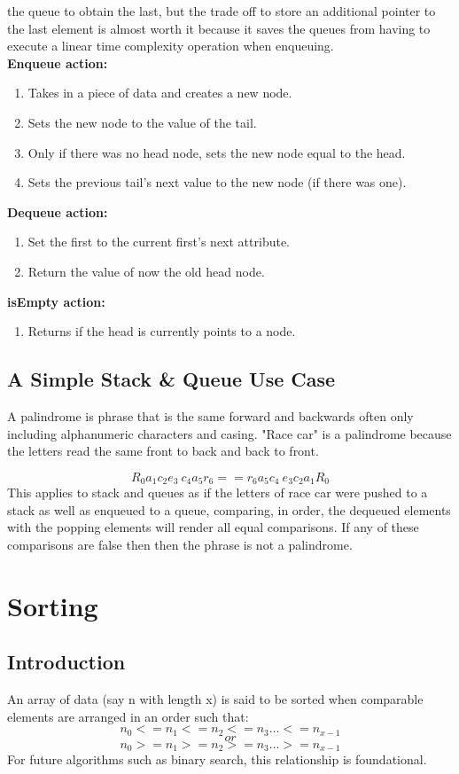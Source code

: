 \documentclass[letterpaper, 10pt]{article}
\begin{document}
the queue to obtain the last, but the trade off to store an additional pointer to the last element is almost worth it because
it saves the queues from having to execute a linear time complexity operation when enqueuing.\\
\textbf{Enqueue action:}
\begin{enumerate}
    \item Takes in a piece of data and creates a new node.
    \item Sets the new node to the value of the tail.
    \item Only if there was no head node, sets the new node equal to the head.
    \item Sets the previous tail's next value to the new node (if there was one).
\end{enumerate}

\textbf{Dequeue action:}
\begin{enumerate}
    \item Set the first to the current first's next attribute.
    \item Return the value of now the old head node.
\end{enumerate}

\textbf{isEmpty action:}
\begin{enumerate}
    \item Returns if the head is currently points to a node.
\end{enumerate}
\subsection{A Simple Stack \& Queue Use Case}
A palindrome is phrase that is the same forward and backwards often only including
alphanumeric characters and casing.  "Race car" is a palindrome because the letters read the same
front to back and back to front.

\[R_0 a_1 c_2 e_3 \ c_4 a_5 r_6 == r_6 a_5 c_4 \ e_3 c_2 a_1 R_0\]
\noindent
This applies to stack and queues as if the letters of race car were pushed to a stack
as well as enqueued to a queue, comparing, in order, the dequeued elements with the popping elements
will render all equal comparisons. If any of these comparisons are false then then the phrase is not
a palindrome.

\section{Sorting}
\subsection{Introduction}
An array of data (say n with length x) is said to be sorted when comparable elements are arranged in an order
such that:
\[n_0 <= n_1 <= n_2 <= n_3 \dots <= n_{x-1} \]
\[or\]
\[n_0 >= n_1 >= n_2 >= n_3 \dots >= n_{x-1}\]
For future algorithms such as binary search, this relationship is foundational.
\end{document}
